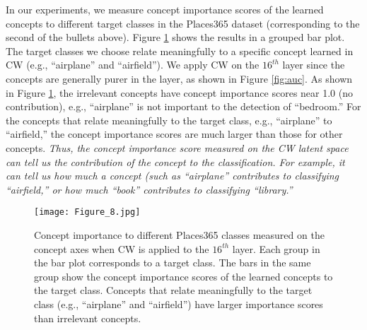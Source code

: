 \documentclass{article}
\begin{document}
In our experiments, we measure concept importance scores of the learned concepts to different target classes in the Places365 dataset (corresponding to the second of the bullets above). Figure \ref{fig:concept_importance} shows the results in a grouped bar plot. The target classes we choose relate meaningfully to a specific concept learned in CW (e.g., ``airplane'' and ``airfield''). We apply CW on the $16^{th}$ layer since the concepts are generally purer in the layer, as shown in Figure \ref{fig:auc}. As shown in Figure \ref{fig:concept_importance}, the irrelevant concepts have concept importance scores near 1.0 (no contribution), e.g., ``airplane'' is not important to the detection of ``bedroom.'' For the concepts that relate meaningfully to the target class, e.g., ``airplane'' to ``airfield,'' the concept importance scores are much larger than those for other concepts. \textit{Thus, the concept importance score measured on the CW latent space can tell us the contribution of the concept to the classification. For example, it can tell us how much a concept (such as ``airplane'' contributes to classifying  ``airfield,'' or how much ``book'' contributes to classifying ``library.''}

\begin{figure}[t]
    \centering
    \texttt{[image: Figure\_8.jpg]}
    \caption{Concept importance to different Places365 classes measured on the concept axes when CW is applied to the $16^{th}$ layer. Each group in the bar plot corresponds to a target class. The bars in the same group show the concept importance scores of the learned concepts to the target class. Concepts that relate meaningfully to the target class (e.g., ``airplane'' and ``airfield'') have larger importance scores than irrelevant concepts.\label{fig:concept_importance}}
\end{figure}
\end{document}
